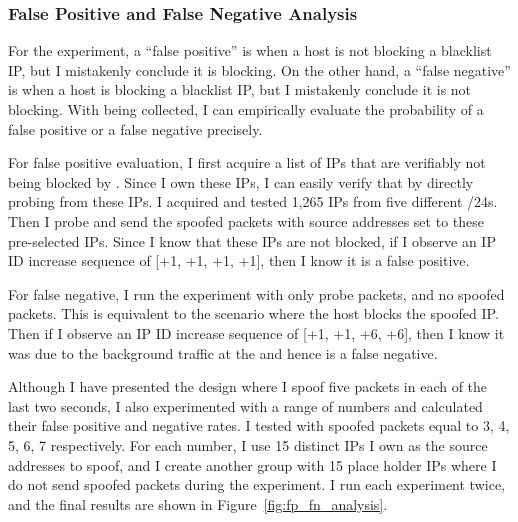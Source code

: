 \subsubsection{False Positive and False Negative Analysis}
\label{subsec:fpfn_analysis}
For the experiment, a ``false positive'' is when a host is not
blocking a blacklist IP, but I mistakenly conclude it is blocking. On the
other hand, a ``false negative'' is when a host is blocking a
blacklist IP, but I mistakenly conclude it is not blocking. With
{} being collected, I can empirically evaluate the
probability of a false positive or a false negative precisely.

For false positive evaluation, I first acquire a list of IPs that are verifiably
not being blocked by {}. Since I own these IPs, I can easily verify
that by directly probing {} from these IPs. I acquired and tested
1,265 IPs from five different /24s. Then I probe {} and send the
spoofed packets with source addresses set to these pre-selected IPs. Since I
know that these IPs are not blocked, if I observe an IP ID increase sequence of
[+1, +1, +1, +1], then I know it is a false positive.

For false negative, I run the experiment with only probe packets, and no
spoofed packets. This is equivalent to the scenario where the host blocks the
spoofed IP. Then if I observe an IP ID increase sequence of [+1, +1, +6,
+6], then I know it was due to the background traffic at the {}
and hence is a false negative.

Although I have presented the design where I spoof five packets
in each of the last two seconds, I also experimented with a range of
numbers and calculated their false positive and negative rates. I tested
with spoofed packets equal to 3, 4, 5, 6, 7 respectively. For each number,
I use 15 distinct IPs I own as the source addresses to spoof, and I
create another group with 15 place holder IPs where I do not send spoofed
packets during the experiment. I run each experiment twice, and the final
results are shown in Figure~\ref{fig:fp_fn_analysis}.


